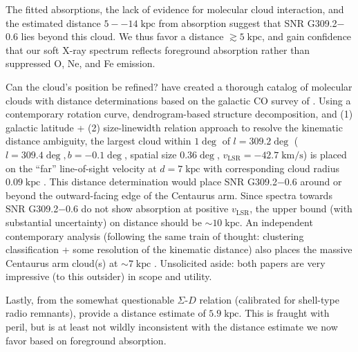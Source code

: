 \documentclass[twocolumn,tighten,trackchanges]{aastex61}
\newcommand*{\mt}{\mathrm}
\newcommand*{\unit}[1]{\;\mt{#1}}  %
\newcommand*{\abt}{\mathord{\sim}} %
\newcommand*{\Gsnr}{G309.2$-$0.6}
\begin{document}
The fitted absorptions, the lack of evidence for molecular cloud interaction,
and the estimated distance $5--14 \unit{kpc}$ from  absorption
suggest that SNR \Gsnr{} lies beyond this cloud.
We thus favor a distance $\gtrsim 5 \unit{kpc}$, and gain confidence that our
soft X-ray spectrum reflects foreground absorption rather than suppressed O,
Ne, and Fe emission.

Can the cloud's position be refined?
\citet{rice2016} have created a thorough catalog of molecular clouds with
distance determinations based on the galactic CO survey of \citet{dame2001}.
Using a contemporary rotation curve, dendrogram-based structure decomposition,
and (1) galactic latitude + (2) size-linewidth relation approach to resolve the
kinematic distance ambiguity,
the largest cloud within $1\deg$ of $l = 309.2\deg$
($l=309.4\deg, b=-0.1\deg$, spatial size $0.36\deg$,
$v_{\mt{LSR}} = -42.7 \unit{km/s}$)
is placed on the ``far'' line-of-sight velocity at $d = 7 \unit{kpc}$ with
corresponding cloud radius $0.09 \unit{kpc}$ \cite[][Table 3]{rice2016}.
This distance determination would place SNR \Gsnr{} around or beyond the
outward-facing edge of the Centaurus arm.
Since  spectra towards SNR \Gsnr{} do not show absorption at positive
$v_{\mt{LSR}}$, the upper bound (with substantial uncertainty) on distance
should be $\abt 10 \unit{kpc}$.
An independent contemporary analysis (following the same train of thought:
clustering classification + some resolution of the kinematic distance) also
places the massive Centaurus arm cloud(s) at $\abt 7 \unit{kpc}$
\citet{miville-deschenes2017}.
Unsolicited aside: both papers are very impressive (to this outsider) in scope
and utility.




Lastly, from the somewhat questionable $\Sigma$-$D$ relation (calibrated for
shell-type radio remnants), \citet{pavlovic2014} provide a distance estimate of
$5.9 \unit{kpc}$.
This is fraught with peril, but is at least not wildly inconsistent with the
distance estimate we now favor based on foreground absorption.
%
\end{document}
